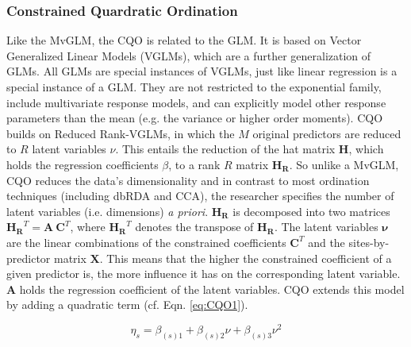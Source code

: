 \documentclass[a4paper,11pt]{article}
\begin{document}
        \subsubsection{Constrained Quardratic Ordination}
	    Like the MvGLM, the CQO is related to the GLM. 
		It is based on Vector Generalized Linear Models (VGLMs), which are a further generalization of GLMs.
		All GLMs are special instances of VGLMs, just like linear regression is a special instance of a GLM.
		They are not restricted to the exponential family, include multivariate response models, and can explicitly model other response parameters than the mean (e.g. the variance or higher order moments).
        CQO builds on Reduced Rank-VGLMs, in which the $M$ original predictors are reduced to $R$ latent variables $\nu$. 
		This entails the reduction of the hat matrix $\mathbf{H}$, which holds the regression coefficients $\beta$, to a rank $R$ matrix $\mathbf{H_R}$.
		So unlike a MvGLM, CQO reduces the data's dimensionality and in contrast to most ordination techniques (including dbRDA and CCA), the researcher specifies the number of latent variables (i.e. dimensions)  \textit{a priori}.
		$\mathbf{H_R}$ is decomposed into two matrices $\mathbf{H_R}^T = \mathbf{A}\ \mathbf{C}^T$, where $\mathbf{H_R}^T$ denotes the transpose of $\mathbf{H_R}$.  
		The latent variables $\mathbf{\nu}$ are the linear combinations of the constrained coefficients $\mathbf{C}^T$ and the sites-by-predictor matrix $\mathbf{X}$.
		This means that the higher the constrained coefficient of a given predictor is, the more influence it has on the corresponding latent variable.   
		$\mathbf{A}$ holds the regression coefficient of the latent variables.
		CQO extends this model by adding a quadratic term (cf. Eqn. \ref{eq:CQO1}). 
	
		\begin{equation}\label{eq:CQO1} 
		\eta_s = \beta_{(s)1} + \beta_{(s)2} \nu + \beta_{(s)3} \nu^2	
		\end{equation} 
		
\end{document}
